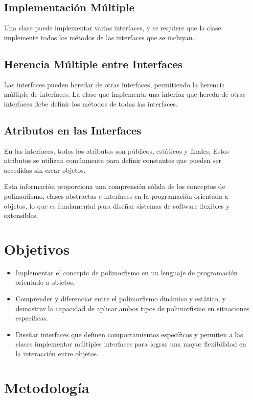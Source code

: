 \documentclass[11pt, twocolumn]{article}
\begin{document}
  \subsection*{Implementación Múltiple}
  Una clase puede implementar varias interfaces, y se requiere que la clase implemente todos los métodos de las interfaces que se incluyan.

  \subsection*{Herencia Múltiple entre Interfaces}
  Las interfaces pueden heredar de otras interfaces, permitiendo la herencia múltiple de interfaces. La clase que implementa una interfaz que hereda de otras interfaces debe definir los métodos de todas las interfaces.

  \subsection*{Atributos en las Interfaces}
  En las interfaces, todos los atributos son públicos, estáticos y finales. Estos atributos se utilizan comúnmente para definir constantes que pueden ser accedidas sin crear objetos.
  
  Esta información proporciona una comprensión sólida de los conceptos de polimorfismo, clases abstractas e interfaces en la programación orientada a objetos, lo que es fundamental para diseñar sistemas de software flexibles y extensibles.

  \section*{Objetivos}
  \begin{itemize}
    \item Implementar el concepto de polimorfismo en un lenguaje de programación orientado a objetos.
    \item Comprender y diferenciar entre el polimorfismo dinámico y estático, y demostrar la capacidad de aplicar ambos tipos de polimorfismo en situaciones específicas.
    \item Diseñar interfaces que definen comportamientos específicos y permiten a las clases implementar múltiples interfaces para lograr una mayor flexibilidad en la interacción entre objetos.
  \end{itemize}

  \section*{Metodología} 
\end{document}
